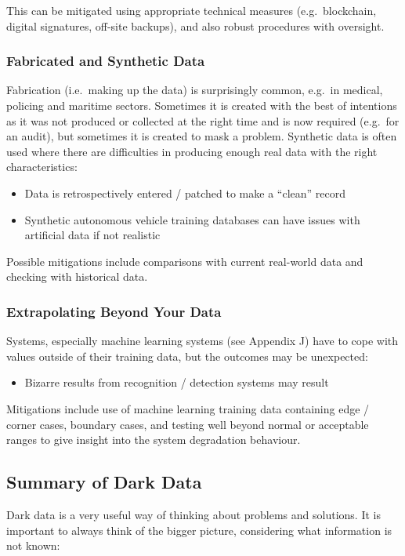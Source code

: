 This can be mitigated using appropriate technical measures (e.g.\ blockchain, digital signatures, off-site backups), and also robust procedures with oversight.

\subsubsection{Fabricated and Synthetic Data}\label{bkm:dark14}
Fabrication (i.e.\ making up the data) is surprisingly common, e.g.\ in medical, policing and maritime sectors. Sometimes it is created with the best of intentions as it was not produced or collected at the right time and is now required (e.g.\ for an audit), but sometimes it is created to mask a problem. Synthetic data is often used where there are difficulties in producing enough real data with the right characteristics:
\begin{itemize}
\item Data is retrospectively entered / patched to make a “clean” record
  \item Synthetic autonomous vehicle training \glspl{database} can have issues with artificial data if not realistic
\end{itemize}

Possible mitigations include comparisons with current real-world data and checking with historical data.

\subsubsection{Extrapolating Beyond Your Data}\label{bkm:dark15}
Systems, especially machine learning systems (see Appendix J) have to cope with values outside of their training data, but the outcomes may be unexpected:
\begin{itemize}
\item Bizarre results from recognition / detection systems may result
\end{itemize}

Mitigations include use of machine learning training data containing edge / corner cases, boundary cases, and testing well beyond normal or acceptable ranges to give insight into the system degradation behaviour.
\subsection{Summary of Dark Data}
Dark data is a very useful way of thinking about problems and solutions. It is important to always think of the bigger picture, considering what \gls{information} is not known:

